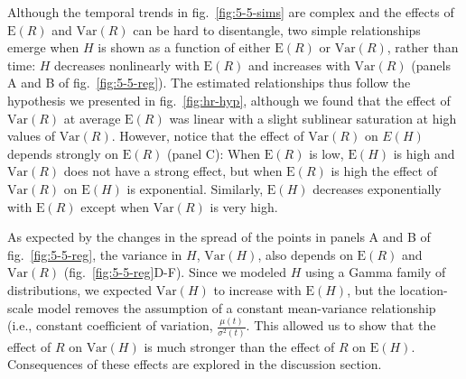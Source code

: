 \documentclass[
  12pt,
]{article}
\begin{document}
Although the temporal trends in fig.~\ref{fig:5-5-sims} are complex and the effects of \(\text{E}(R)\) and \(\text{Var}(R)\) can be hard to disentangle, two simple relationships emerge when \(H\) is shown as a function of either \(\text{E}(R)\) or \(\text{Var}(R)\), rather than time: \(H\) decreases nonlinearly with \(\text{E}(R)\) and increases with \(\text{Var}(R)\) (panels A and B of fig.~\ref{fig:5-5-reg}). The estimated relationships thus follow the hypothesis we presented in fig.~\ref{fig:hr-hyp}, although we found that the effect of \(\text{Var}(R)\) at average \(\text{E}(R)\) was linear with a slight sublinear saturation at high values of \(\text{Var}(R)\). However, notice that the effect of \(\text{Var}(R)\) on \(E(H)\) depends strongly on \(\text{E}(R)\) (panel C): When \(\text{E}(R)\) is low, \(\text{E}(H)\) is high and \(\text{Var}(R)\) does not have a strong effect, but when \(\text{E}(R)\) is high the effect of \(\text{Var}(R)\) on \(\text{E}(H)\) is exponential. Similarly, \(\text{E}(H)\) decreases exponentially with \(\text{E}(R)\) except when \(\text{Var}(R)\) is very high.

As expected by the changes in the spread of the points in panels A and B of fig.~\ref{fig:5-5-reg}, the variance in \(H\), \(\text{Var}(H)\), also depends on \(\text{E}(R)\) and \(\text{Var}(R)\) (fig.~\ref{fig:5-5-reg}D-F). Since we modeled \(H\) using a Gamma family of distributions, we expected \(\text{Var}(H)\) to increase with \(\text{E}(H)\), but the location-scale model removes the assumption of a constant mean-variance relationship (i.e., constant coefficient of variation, \(\frac{\mu(t)}{\sigma^2(t)}\). This allowed us to show that the effect of \(R\) on \(\text{Var}(H)\) is much stronger than the effect of \(R\) on \(\text{E}(H)\). Consequences of these effects are explored in the discussion section.
\end{document}
